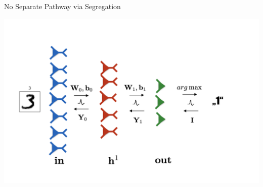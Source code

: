 \documentclass[dvipsnames, usenames]{beamer}
\begin{document}
\begin{frame}{No Separate Pathway via Segregation}

\centering 
\includegraphics[width=1.1\textwidth]{../figures/report/elec_seg_4}
\end{frame}
\end{document}
